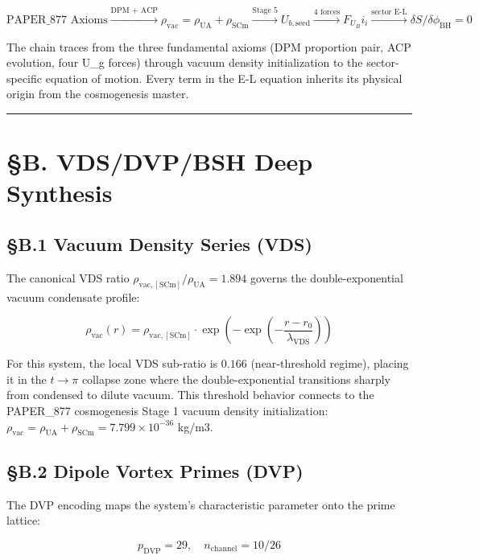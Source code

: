 \documentclass[12pt,a4paper]{article}
\begin{document}
\begin{equation}
\text{PAPER\_877 Axioms} \xrightarrow{\text{DPM + ACP}} \rho_{\mathrm{vac}} = \rho_{\mathrm{UA}} + \rho_{\mathrm{SCm}} \xrightarrow{\text{Stage 5}} U_{b,\mathrm{seed}} \xrightarrow{\text{4 forces}} F_U_Bi_i \xrightarrow{\text{sector E-L}} \delta S/\delta \phi_{\mathrm{BH}} = 0
\end{equation}

The chain traces from the three fundamental axioms (DPM proportion pair, ACP evolution, four U\_g forces) through vacuum density initialization to the sector-specific equation of motion. Every term in the E-L equation inherits its physical origin from the cosmogenesis master.

\medskip\hrule\medskip

\section{\S{}B. VDS/DVP/BSH Deep Synthesis}

\subsection{\S{}B.1 Vacuum Density Series (VDS)}

The canonical VDS ratio $\rho_{\mathrm{vac,[SCm]}} / \rho_{\mathrm{UA}} = 1.894$ governs the double-exponential vacuum condensate profile:

\begin{equation}
\rho_{\mathrm{vac}}(r) = \rho_{\mathrm{vac,[SCm]}} \cdot \exp\!\left(-\exp\!\left(-\frac{r - r_0}{\lambda_{\mathrm{VDS}}}\right)\right)
\end{equation}

For this system, the local VDS sub-ratio is $0.166$ (near-threshold regime), placing it in the $t \to \pi$ collapse zone where the double-exponential transitions sharply from condensed to dilute vacuum. This threshold behavior connects to the PAPER\_877 cosmogenesis Stage 1 vacuum density initialization: $\rho_{\mathrm{vac}} = \rho_{\mathrm{UA}} + \rho_{\mathrm{SCm}} = 7.799 \times 10^{-36}$ kg/m3.

\subsection{\S{}B.2 Dipole Vortex Primes (DVP)}

The DVP encoding maps the system's characteristic parameter onto the prime lattice:

\begin{equation}
p_{\mathrm{DVP}} = 29, \quad n_{\mathrm{channel}} = 10/26
\end{equation}
\end{document}
